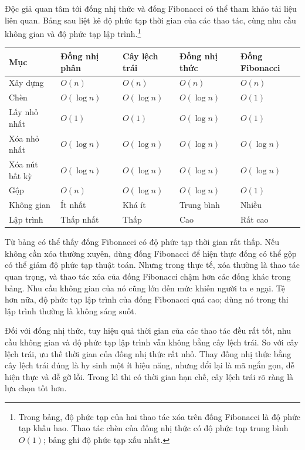 \documentclass[11pt]{article}
\begin{document}
Độc giả quan tâm tới đống nhị thức và đống Fibonacci có thể tham khảo tài liệu
liên quan. Bảng sau liệt kê độ phức tạp thời gian của các thao tác, cùng nhu
cầu không gian và độ phức tạp lập trình.\footnote{Trong bảng, độ phức tạp của
hai thao tác xóa trên đống Fibonacci là độ phức tạp khấu hao. Thao tác chèn của
đống nhị thức có độ phức tạp trung bình \(O(1)\); bảng ghi độ phức tạp xấu
nhất.}

\begin{center}
\begin{tabular}{lllll}
\hline
Mục & Đống nhị phân & Cây lệch trái & Đống nhị thức & Đống Fibonacci\\
\hline
Xây dựng & \(O(n)\) & \(O(n)\) & \(O(n)\) & \(O(n)\)\\
Chèn & \(O(\log n)\) & \(O(\log n)\) & \(O(\log n)\) & \(O(1)\)\\
Lấy nhỏ nhất & \(O(1)\) & \(O(1)\) & \(O(\log n)\) & \(O(1)\)\\
Xóa nhỏ nhất & \(O(\log n)\) & \(O(\log n)\) & \(O(\log n)\) & \(O(\log n)\)\\
Xóa nút bất kỳ & \(O(\log n)\) & \(O(\log n)\) & \(O(\log n)\) & \(O(\log n)\)\\
Gộp & \(O(n)\) & \(O(\log n)\) & \(O(\log n)\) & \(O(1)\)\\
Không gian & Ít nhất & Khá ít & Trung bình & Nhiều\\
Lập trình & Thấp nhất & Thấp & Cao & Rất cao\\
\hline
\end{tabular}
\end{center}

Từ bảng có thể thấy đống Fibonacci có độ phức tạp thời gian rất thấp. Nếu không
cần xóa thường xuyên, dùng đống Fibonacci để hiện thực đống có thể gộp có thể
giảm độ phức tạp thuật toán. Nhưng trong thực tế, xóa thường là thao tác quan
trọng, và thao tác xóa của đống Fibonacci chậm hơn các đống khác trong bảng.
Nhu cầu không gian của nó cũng lớn đến mức khiến người ta e ngại. Tệ hơn nữa,
độ phức tạp lập trình của đống Fibonacci quá cao; dùng nó trong thi lập trình
thường là không sáng suốt.

Đối với đống nhị thức, tuy hiệu quả thời gian của các thao tác đều rất tốt,
nhu cầu không gian và độ phức tạp lập trình vẫn không bằng cây lệch trái. So
với cây lệch trái, ưu thế thời gian của đống nhị thức rất nhỏ. Thay đống nhị
thức bằng cây lệch trái đúng là hy sinh một ít hiệu năng, nhưng đổi lại là mã
ngắn gọn, dễ hiện thực và dễ gỡ lỗi. Trong kì thi có thời gian hạn chế, cây
lệch trái rõ ràng là lựa chọn tốt hơn.
\end{document}
